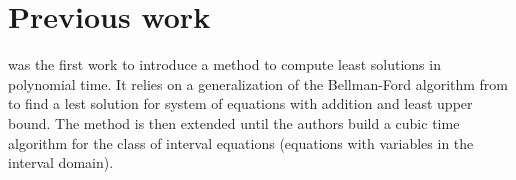 \section{Previous work}
\label{sec:prev}

\cite{Gawlitza2009} was the first work to introduce a method to
compute least solutions in polynomial time. It relies on a
generalization of the Bellman-Ford algorithm from
\cite{bellman1958algo} to find a lest solution for system of equations
with addition and least upper bound. The method is then extended until
the authors build a cubic time algorithm for the class of interval
equations (equations with variables in the interval domain).
